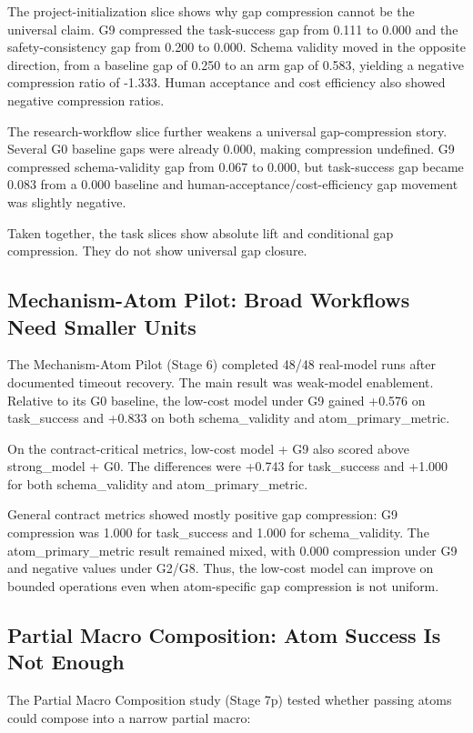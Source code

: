 \documentclass[11pt]{article}
\begin{document}
The project-initialization slice shows why gap compression cannot be the universal claim. G9 compressed the task-success gap from 0.111 to 0.000 and the safety-consistency gap from 0.200 to 0.000. Schema validity moved in the opposite direction, from a baseline gap of 0.250 to an arm gap of 0.583, yielding a negative compression ratio of -1.333. Human acceptance and cost efficiency also showed negative compression ratios.

The research-workflow slice further weakens a universal gap-compression story. Several G0 baseline gaps were already 0.000, making compression undefined. G9 compressed schema-validity gap from 0.067 to 0.000, but task-success gap became 0.083 from a 0.000 baseline and human-acceptance/cost-efficiency gap movement was slightly negative.

Taken together, the task slices show absolute lift and conditional gap compression. They do not show universal gap closure.

\subsection{Mechanism-Atom Pilot: Broad Workflows Need Smaller Units}

The Mechanism-Atom Pilot (Stage 6) completed 48/48 real-model runs after documented timeout recovery. The main result was weak-model enablement. Relative to its G0 baseline, the low-cost model under G9 gained +0.576 on task\_success and +0.833 on both schema\_validity and atom\_primary\_metric.

On the contract-critical metrics, low-cost model + G9 also scored above strong\_model + G0. The differences were +0.743 for task\_success and +1.000 for both schema\_validity and atom\_primary\_metric.

General contract metrics showed mostly positive gap compression: G9 compression was 1.000 for task\_success and 1.000 for schema\_validity. The atom\_primary\_metric result remained mixed, with 0.000 compression under G9 and negative values under G2/G8. Thus, the low-cost model can improve on bounded operations even when atom-specific gap compression is not uniform.

\subsection{Partial Macro Composition: Atom Success Is Not Enough}

The Partial Macro Composition study (Stage 7p) tested whether passing atoms could compose into a narrow partial macro:
\end{document}
